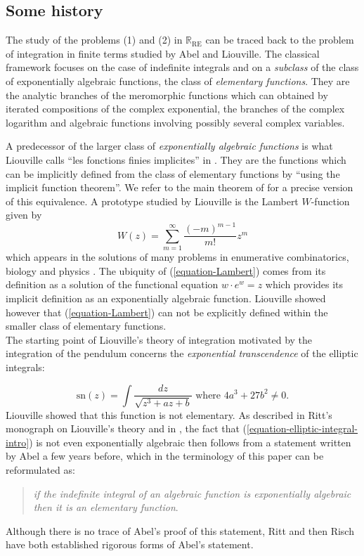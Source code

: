 \documentclass[12pt]{amsart}
\theoremstyle{definition}
\theoremstyle{plain}
\theoremstyle{exampstyle}\newtheorem{thmx}{Theorem}
\theoremstyle{exampstyle}\newtheorem{thmxbis}{Theorem}
\begin{document}
\subsection{Some history} The study of the problems (1) and (2) in $\mathbb{R}_{\mathrm{RE}}$ can be traced back to the problem of integration in finite terms studied by Abel and Liouville. The classical framework focuses on the case of indefinite integrals and on a {\em subclass} of the class of exponentially algebraic functions, the class of {\em elementary functions}.  They are the analytic branches of the meromorphic functions which can obtained by iterated compositions of the complex exponential, the branches of the complex logarithm and algebraic functions involving possibly several complex variables.

A predecessor of the larger class of {\em exponentially algebraic functions} is what Liouville calls ``les fonctions finies implicites'' in \cite{Liouville}. They are the functions which can be implicitly defined from the class of elementary functions by ``using the implicit function theorem''. We refer to the main theorem of \cite{Wilkie} for a precise version of this equivalence. A prototype studied by Liouville is the Lambert $W$-function given by
\begin{equation}\label{equation-Lambert}
W(z) = \sum_{m = 1}^\infty \frac{(-m)^{m-1}}{m!} z^m
\end{equation}
which appears in the solutions of many problems in enumerative combinatorics, biology and physics \cite{Lambert-general,Lambert-quantum}. The ubiquity of (\ref{equation-Lambert}) comes from  its definition as a solution of the functional equation $w \cdot e^{w} =  z$ which provides its implicit definition as an exponentially algebraic function. Liouville \cite{Liouville} showed however that (\ref{equation-Lambert}) can not be explicitly defined within the smaller class of elementary functions. \\

The starting point of Liouville's theory of integration \cite{Liouville2} motivated by the integration of the pendulum concerns the {\em exponential transcendence} of the elliptic integrals:

\begin{equation}\label{equation-elliptic-integral-intro}
 \mathrm{sn}(z) = \int \frac{dz}{\sqrt{z^3 + az + b}} \text{ where } 4a^3 + 27b^2 \neq 0.
 \end{equation}
Liouville showed that this function is not elementary. As described in Ritt's monograph \cite{Ritt-book} on Liouville's theory and in \cite{Singer-survey}, the fact that (\ref{equation-elliptic-integral-intro}) is not even exponentially algebraic then follows from a statement written by Abel a few years before, which in the terminology of this paper can be reformulated as:
\begin{quote} 
\textit{if the indefinite integral of an algebraic function is exponentially algebraic then it is an elementary function}.
\end{quote}
Although there is no trace of Abel's proof of this statement, Ritt \cite{Ritt-book} and then Risch \cite{Risch3} have both established rigorous forms of Abel's statement. 
\end{document}
